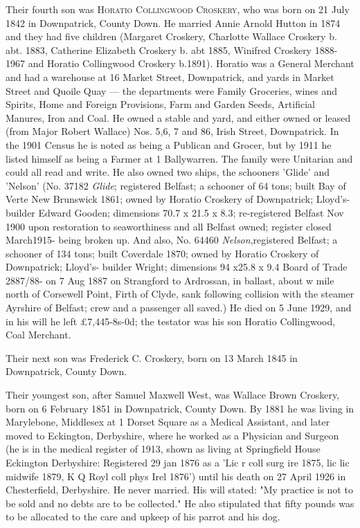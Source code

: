 Their fourth son was \textsc{Horatio Collingwood Croskery}, who was born on	21 July 1842 in Downpatrick, County Down. He married Annie Arnold Hutton in 1874 and they had five children (Margaret Croskery, Charlotte Wallace Croskery b. abt. 1883, 
Catherine Elizabeth Croskery b. abt 1885, Winifred Croskery 1888-1967 and Horatio Collingwood Croskery b.1891).  Horatio was a General Merchant and had a warehouse at 16 Market Street, Downpatrick, and yards in Market Street and Quoile Quay — the departments were Family Groceries, wines and Spirits, Home and Foreign Provisions, Farm and Garden Seeds, Artificial Manures, Iron and Coal. He owned a stable and yard, and either owned or leased (from Major Robert Wallace) Nos. 5,6, 7 and 86, Irish Street, Downpatrick. In the 1901 Census he is noted as being a Publican and Grocer, but by 1911 he listed himself as being a Farmer at 1 Ballywarren. The family were Unitarian and could all read and write. He also owned two ships, the schooners 'Glide' and 'Nelson' (No. 37182 \textit{Glide}; registered Belfast; a schooner of 64 tons; built Bay of Verte New Brunswick 1861; owned by Horatio Croskery of Downpatrick; Lloyd’s- builder Edward Gooden; dimensions 70.7 x 21.5 x 8.3; re-registered Belfast Nov 1900 upon restoration to seaworthiness and all Belfast owned; register closed March1915- being broken up. And also, No. 64460 \textit{Nelson},registered Belfast; a schooner of 134 tons; built Coverdale 1870; owned by Horatio Croskery of Downpatrick; Lloyd’s- builder Wright; dimensions 94 x25.8 x 9.4 Board of Trade 2887/88- on 7 Aug 1887 on Strangford to Ardrossan, in ballast, about w mile north of Corsewell Point, Firth of Clyde, sank following collision with the steamer Ayrshire of Belfast; crew and a passenger all saved.)   He died on 5 June 1929, and in his will he left £7,445-8s-0d; the testator was his son Horatio Collingwood, Coal Merchant. 

Their next son was Frederick C. Croskery, born on 13 March 1845 in Downpatrick, County Down.

Their youngest son, after Samuel Maxwell West, was Wallace Brown Croskery, born on 6 February 1851 in Downpatrick, County Down.  By 1881 he was living in Marylebone, Middlesex at 1 Dorset Square as a Medical Assistant, and later moved to Eckington, Derbyshire, where he worked as a Physician and Surgeon  (he is in the medical register of 1913, shown as living at Springfield House Eckington Derbyshire: Registered 29 jan 1876 as a 'Lic r coll surg ire 1875, lic lic midwife 1879, K Q Royl coll phys Irel 1876') until his death on 27 April 1926 in Chesterfield, Derbyshire. He never married.  His will stated: "My practice is not to be sold and no debts are to be collected." He also stipulated that fifty pounds was to be allocated to the care and upkeep of his parrot and his dog.

